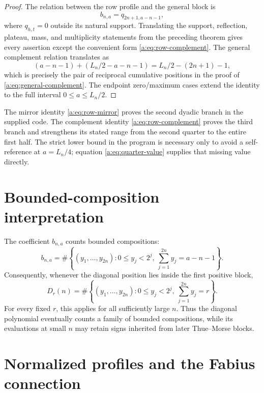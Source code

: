 \documentclass[11pt,a4paper,oneside,openany]{book}
\numberwithin{equation}{chapter}
\theoremstyle{definition}
\theoremstyle{remark}
\newcommand{\Diag}{D}
\begin{document}
\begin{proof}
The relation between the row profile and the general block is
\begin{equation}
 b_{n,a}=q_{2n+1,a-n-1},
 \label{a:eq:b-q-shift}
\end{equation}
where \(q_{h,t}=0\) outside its natural support.  Translating the support,
reflection, plateau, mass, and multiplicity statements from the preceding
theorem gives every assertion except the convenient form
\eqref{a:eq:row-complement}.  The general complement relation translates as
\[
 (a-n-1)+(L_n/2-a-n-1)
 =L_n/2-(2n+1)-1,
\]
which is precisely the pair of reciprocal cumulative positions in the proof
of \eqref{a:eq:general-complement}.  The endpoint zero/maximum cases extend the
identity to the full interval \(0\le a\le L_n/2\).
\end{proof}

The mirror identity \eqref{a:eq:row-mirror} proves the second dyadic branch in
the supplied code.  The complement identity \eqref{a:eq:row-complement} proves
the third branch and strengthens its stated range from the second quarter to
the entire first half.  The strict lower bound in the program is necessary
only to avoid a self-reference at \(a=L_n/4\); equation
\eqref{a:eq:quarter-value} supplies that missing value directly.

\section{Bounded-composition interpretation}

The coefficient \(b_{n,a}\) counts bounded compositions:
\begin{equation}
 b_{n,a}
 =\#\left\{(y_1,\ldots,y_{2n}):
 0\le y_j<2^j,
 \ \sum_{j=1}^{2n}y_j=a-n-1\right\}.
 \label{a:eq:bounded-composition}
\end{equation}
Consequently, whenever the diagonal position lies inside the first positive
block,
\begin{equation}
 \Diag_r(n)=
 \#\left\{(y_1,\ldots,y_{2n}):
 0\le y_j<2^j,
 \ \sum_{j=1}^{2n}y_j=r\right\}.
 \label{a:eq:diagonal-composition}
\end{equation}
For every fixed \(r\), this applies for all sufficiently large \(n\).  Thus the
diagonal polynomial eventually counts a family of bounded compositions, while
its evaluations at small \(n\) may retain signs inherited from later
Thue--Morse blocks.

\section{Normalized profiles and the Fabius connection}
\end{document}
